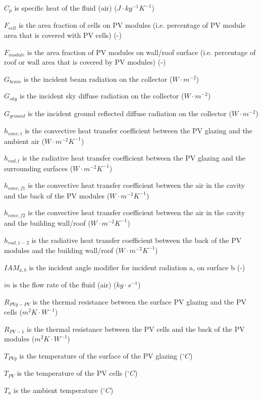 \(C_{p}\) is specific heat of the fluid (air) (\(J\cdot kg^{-1}K^{-1}\))

\(F_{cell}\) is the area fraction of cells on PV modules (i.e. percentage of PV module area that is covered with PV cells) (-)

\(F_{module}\) is the area fraction of PV modules on wall/roof surface (i.e. percentage of roof or wall area that is covered by PV modules) (-)

\(G_{beam}\) is the incident beam radiation on the collector (\(W\cdot m^{-2}\))

\(G_{sky}\) is the incident sky diffuse radiation on the collector (\(W\cdot m^{-2}\))

\(G_{ground}\) is the incident ground reflected diffuse radiation on the collector (\(W\cdot m^{-2}\))

\(h_{conv,t}\) is the convective heat transfer coefficient between the PV glazing and the ambient air (\(W\cdot m^{-2}K^{-1}\))

\(h_{rad,t}\) is the radiative heat transfer coefficient between the PV glazing and the surrounding surfaces (\(W\cdot m^{-2}K^{-1}\))

\(h_{conv,f1}\) is the convective heat transfer coefficient between the air in the cavity and the back of the PV modules (\(W\cdot m^{-2}K^{-1}\))

\(h_{conv,f2}\) is the convective heat transfer coefficient between the air in the cavity and the building wall/roof (\(W\cdot m^{-2}K^{-1}\))

\(h_{rad,1-2}\) is the radiative heat transfer coefficient between the back of the PV modules and the building wall/roof (\(W\cdot m^{-2}K^{-1}\))

\(IAM_{a,b}\) is the incident angle modifier for incident radiation a, on surface b (-)

\(\dot{m}\) is the flow rate of the fluid (air) (\(kg\cdot s^{-1}\))

\(R_{PVg-PV}\) is the thermal resistance between the surface PV glazing and the PV cells (\(m^{2}K\cdot W^{-1}\))

\(R_{PV-1}\) is the thermal resistance between the PV cells and the back of the PV modules (\(m^{2}K\cdot W^{-1}\))

\(T_{PVg}\) is the temperature of the surface of the PV glazing (\(^{\circ}C\))

\(T_{PV}\) is the temperature of the PV cells (\(^{\circ}C\))

\(T_{a}\) is the ambient temperature (\(^{\circ}C\))

